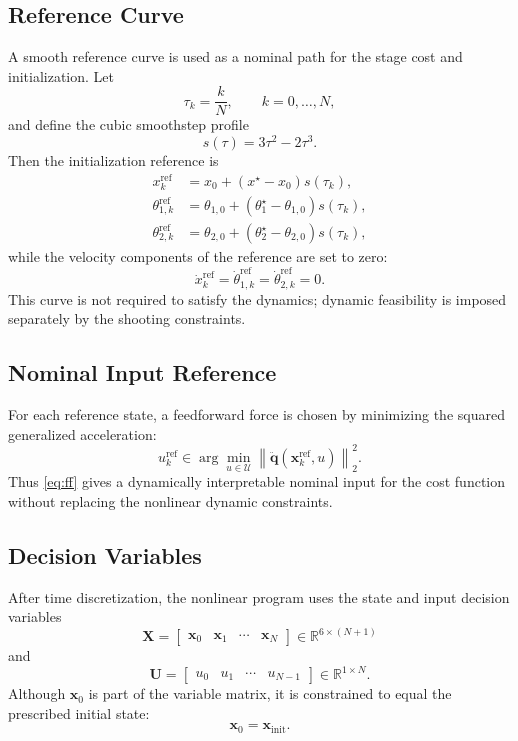 \documentclass[conference]{IEEEtran}
\begin{document}
\subsection{Reference Curve}
A smooth reference curve is used as a nominal path for the stage cost and initialization. Let
\begin{equation}
\tau_k = \frac{k}{N}, \qquad k=0,\ldots,N,
\end{equation}
and define the cubic smoothstep profile
\begin{equation}
s(\tau) = 3\tau^2 - 2\tau^3.
\end{equation}
Then the initialization reference is
\begin{align}
x_k^{\mathrm{ref}} &= x_0 + (x^\star - x_0)s(\tau_k), \\
\theta_{1,k}^{\mathrm{ref}} &= \theta_{1,0} + (\theta_1^\star - \theta_{1,0})s(\tau_k), \\
\theta_{2,k}^{\mathrm{ref}} &= \theta_{2,0} + (\theta_2^\star - \theta_{2,0})s(\tau_k),
\end{align}
while the velocity components of the reference are set to zero:
\begin{equation}
\dot{x}_k^{\mathrm{ref}} = \dot{\theta}_{1,k}^{\mathrm{ref}} = \dot{\theta}_{2,k}^{\mathrm{ref}} = 0.
\end{equation}
This curve is not required to satisfy the dynamics; dynamic feasibility is imposed separately by the shooting constraints.

\subsection{Nominal Input Reference}
For each reference state, a feedforward force is chosen by minimizing the squared generalized acceleration:
\begin{equation}
u_k^{\mathrm{ref}} \in \arg\min_{u \in \mathcal{U}} \left\| \ddot{\bm{q}}(\bm{x}_k^{\mathrm{ref}},u) \right\|_2^2.
\label{eq:ff}
\end{equation}
Thus \eqref{eq:ff} gives a dynamically interpretable nominal input for the cost function without replacing the nonlinear dynamic constraints.

\subsection{Decision Variables}
After time discretization, the nonlinear program uses the state and input decision variables
\begin{equation}
\bm{X} = \begin{bmatrix}\bm{x}_0 & \bm{x}_1 & \cdots & \bm{x}_N\end{bmatrix} \in \mathbb{R}^{6 \times (N+1)}
\end{equation}
and
\begin{equation}
\bm{U} = \begin{bmatrix}u_0 & u_1 & \cdots & u_{N-1}\end{bmatrix} \in \mathbb{R}^{1 \times N}.
\end{equation}
Although $\bm{x}_0$ is part of the variable matrix, it is constrained to equal the prescribed initial state:
\begin{equation}
\bm{x}_0 = \bm{x}_{\mathrm{init}}.
\end{equation}
\end{document}
